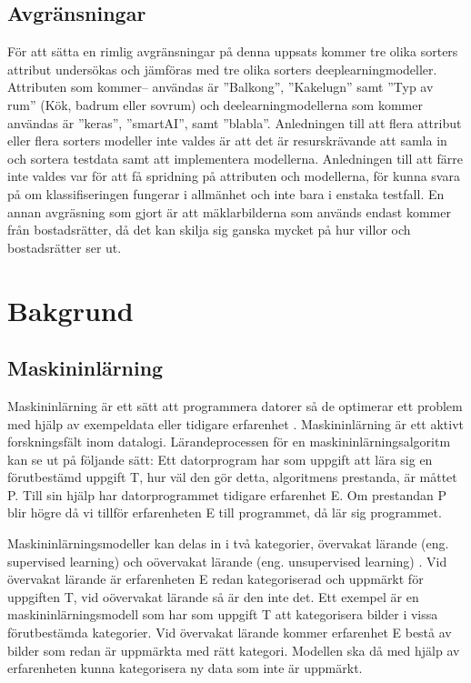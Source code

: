 \documentclass[]{kththesis}
\begin{document}
\section{Avgränsningar}
För att sätta en rimlig avgränsningar på denna uppsats kommer tre olika sorters attribut undersökas och jämföras med tre olika sorters deeplearningmodeller. 
Attributen som kommer– användas är ”Balkong”, ”Kakelugn” samt ”Typ av rum” (Kök, badrum eller sovrum) och deelearningmodellerna som kommer användas är ”keras”, ”smartAI”, samt ”blabla”. 
Anledningen till att flera attribut eller flera sorters modeller inte valdes är att det är resurskrävande att samla in och sortera testdata samt att implementera modellerna. 
Anledningen till att färre inte valdes var för att få spridning på attributen och modellerna, för kunna svara på om klassifiseringen fungerar i allmänhet och inte bara i enstaka testfall. 
En annan avgräsning som gjort är att mäklarbilderna som används endast kommer från bostadsrätter, då det kan skilja sig ganska mycket på hur villor och bostadsrätter ser ut.

\chapter{Bakgrund}

\section{Maskininlärning}
Maskininlärning är ett sätt att programmera datorer så de optimerar ett problem med hjälp av exempeldata eller tidigare erfarenhet \parencite{alpaydin2009introduction}. Maskininlärning är ett aktivt forskningsfält inom datalogi. Lärandeprocessen för en maskininlärningsalgoritm kan se ut på följande sätt: Ett datorprogram har som uppgift att lära sig en förutbestämd uppgift T, hur väl den gör detta, algoritmens prestanda, är måttet P. Till sin hjälp har datorprogrammet tidigare erfarenhet E. Om prestandan P blir högre då vi tillför erfarenheten E till programmet, då lär sig programmet.

Maskininlärningsmodeller kan delas in i två kategorier, övervakat lärande (eng. supervised learning) och oövervakat lärande (eng. unsupervised learning) \parencite{murphy2012machine}. Vid övervakat lärande är erfarenheten E redan kategoriserad och uppmärkt för uppgiften T, vid oövervakat lärande så är den inte det. Ett exempel är en maskininlärningsmodell som har som uppgift T att kategorisera bilder i vissa förutbestämda kategorier. Vid övervakat lärande kommer erfarenhet E bestå av bilder som redan är uppmärkta med rätt kategori. Modellen ska då med hjälp av erfarenheten kunna kategorisera ny data som inte är uppmärkt. 
\end{document}
